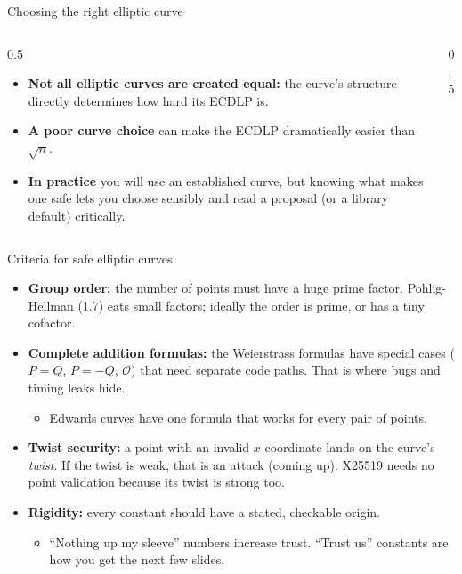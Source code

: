 \ifdefined\PRESENTATION\else\PassOptionsToClass{handout}{beamer}\fi\documentclass[aspectratio=169, lualatex]{beamer}
\begin{document}
\begin{frame}{Choosing the right elliptic curve}
	\begin{columns}[c]
		\begin{column}{0.5\textwidth}
			\begin{itemize}
				\item \textbf{Not all elliptic curves are created equal:} the curve's structure directly determines how hard its ECDLP is.
				\item \textbf{A poor curve choice} can make the ECDLP dramatically easier than $\sqrt{n}$.
				\item \textbf{In practice} you will use an established curve, but knowing what makes one safe lets you choose sensibly and read a proposal (or a library default) critically.
			\end{itemize}
		\end{column}
		\begin{column}{0.5\textwidth}
		\end{column}
	\end{columns}
\end{frame}

\begin{frame}{Criteria for safe elliptic curves}
	\begin{itemize}
		\item \textbf{Group order:} the number of points must have a huge prime factor. Pohlig-Hellman (1.7) eats small factors; ideally the order is prime, or has a tiny cofactor.
		\item \textbf{Complete addition formulas:} the Weierstrass formulas have special cases ($P = Q$, $P = -Q$, $\mathcal{O}$) that need separate code paths. That is where bugs and timing leaks hide.
		      \begin{itemize}
			      \item Edwards curves have one formula that works for every pair of points.
		      \end{itemize}
		\item \textbf{Twist security:} a point with an invalid $x$-coordinate lands on the curve's \emph{twist}. If the twist is weak, that is an attack (coming up). X25519 needs no point validation because its twist is strong too.
		\item \textbf{Rigidity:} every constant should have a stated, checkable origin.
		      \begin{itemize}
			      \item ``Nothing up my sleeve'' numbers increase trust. ``Trust us'' constants are how you get the next few slides.
		      \end{itemize}
	\end{itemize}
\end{frame}
\end{document}
